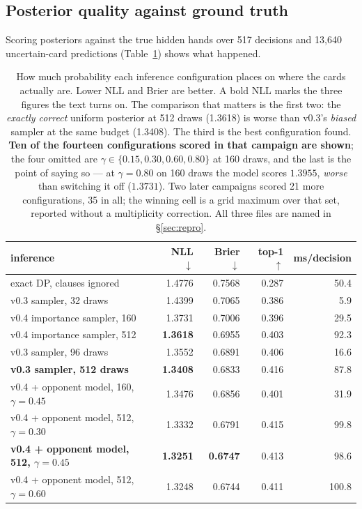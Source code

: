 \documentclass[11pt,letterpaper]{article}
\begin{document}
\subsection{Posterior quality against ground truth}
\label{sec:res-posterior}

Scoring posteriors against the true hidden hands over 517 decisions and 13{,}640
uncertain-card predictions (Table~\ref{tab:posterior}) shows what happened.

\begin{table}[t]
\centering
\small
\begin{tabular}{lrrrr}
\toprule
inference & NLL $\downarrow$ & Brier $\downarrow$ & top-1 $\uparrow$ & ms/decision \\
\midrule
exact DP, clauses ignored          & 1.4776 & 0.7568 & 0.287 & 50.4 \\
v0.3 sampler, 32 draws             & 1.4399 & 0.7065 & 0.386 & 5.9 \\
v0.4 importance sampler, 160       & 1.3731 & 0.7006 & 0.396 & 29.5 \\
v0.4 importance sampler, 512       & \textbf{1.3618} & 0.6955 & 0.403 & 92.3 \\
v0.3 sampler, 96 draws             & 1.3552 & 0.6891 & 0.406 & 16.6 \\
\textbf{v0.3 sampler, 512 draws}   & \textbf{1.3408} & 0.6833 & 0.416 & 87.8 \\
v0.4 + opponent model, 160, $\gamma{=}0.45$ & 1.3476 & 0.6856 & 0.401 & 31.9 \\
v0.4 + opponent model, 512, $\gamma{=}0.30$ & 1.3332 & 0.6791 & 0.415 & 99.8 \\
\textbf{v0.4 + opponent model, 512, $\gamma{=}0.45$} & \textbf{1.3251} & \textbf{0.6747} & 0.413 & 98.6 \\
v0.4 + opponent model, 512, $\gamma{=}0.60$ & 1.3248 & 0.6744 & 0.411 & 100.8 \\
\bottomrule
\end{tabular}
\caption{How much probability each inference configuration places on where the
cards actually are. Lower NLL and Brier are better. A bold NLL marks the three
figures the text turns on. The comparison that matters is the first two: the
\emph{exactly correct} uniform posterior at 512 draws (1.3618) is worse than
v0.3's \emph{biased} sampler at the same budget (1.3408). The third is the
best configuration found. \textbf{Ten of the fourteen configurations scored in
that campaign are shown}; the four omitted are
$\gamma \in \{0.15, 0.30, 0.60, 0.80\}$ at 160 draws, and the last is the
point of saying so --- at $\gamma = 0.80$ on 160 draws the model scores
$1.3955$, \emph{worse} than switching it off ($1.3731$). Two later campaigns
scored 21 more configurations, 35 in all; the winning cell is a grid maximum
over that set, reported without a multiplicity correction. All three files are
named in \S\ref{sec:repro}.}
\label{tab:posterior}
\end{table}
\end{document}
